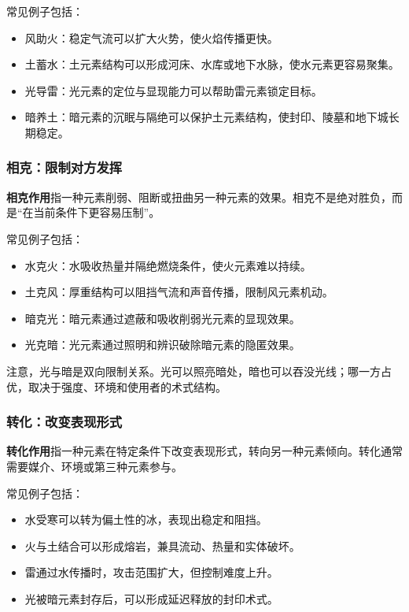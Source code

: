 常见例子包括：
\begin{itemize}
    \item 风助火：稳定气流可以扩大火势，使火焰传播更快。
    \item 土蓄水：土元素结构可以形成河床、水库或地下水脉，使水元素更容易聚集。
    \item 光导雷：光元素的定位与显现能力可以帮助雷元素锁定目标。
    \item 暗养土：暗元素的沉眠与隔绝可以保护土元素结构，使封印、陵墓和地下城长期稳定。
\end{itemize}

\subsubsection{相克：限制对方发挥}

\textbf{相克作用}指一种元素削弱、阻断或扭曲另一种元素的效果。相克不是绝对胜负，而是“在当前条件下更容易压制”。

常见例子包括：
\begin{itemize}
    \item 水克火：水吸收热量并隔绝燃烧条件，使火元素难以持续。
    \item 土克风：厚重结构可以阻挡气流和声音传播，限制风元素机动。
    \item 暗克光：暗元素通过遮蔽和吸收削弱光元素的显现效果。
    \item 光克暗：光元素通过照明和辨识破除暗元素的隐匿效果。
\end{itemize}

注意，光与暗是双向限制关系。光可以照亮暗处，暗也可以吞没光线；哪一方占优，取决于强度、环境和使用者的术式结构。

\subsubsection{转化：改变表现形式}

\textbf{转化作用}指一种元素在特定条件下改变表现形式，转向另一种元素倾向。转化通常需要媒介、环境或第三种元素参与。

常见例子包括：
\begin{itemize}
    \item 水受寒可以转为偏土性的冰，表现出稳定和阻挡。
    \item 火与土结合可以形成熔岩，兼具流动、热量和实体破坏。
    \item 雷通过水传播时，攻击范围扩大，但控制难度上升。
    \item 光被暗元素封存后，可以形成延迟释放的封印术式。
\end{itemize}

